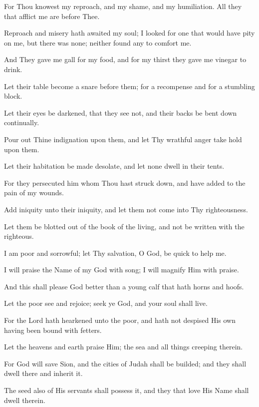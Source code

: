 For Thou knowest my reproach, and my shame, and my humiliation. All they that afflict me are before Thee.

Reproach and misery hath awaited my soul; I looked for one that would have pity on me, but there was none; neither found any to comfort me.

And They gave me gall for my food, and for my thirst they gave me vinegar to drink.

Let their table become a snare before them; for a recompense and for a stumbling block.

Let their eyes be darkened, that they see not, and their backs be bent down continually.

Pour out Thine indignation upon them, and let Thy wrathful anger take hold upon them.

Let their habitation be made desolate, and let none dwell in their tents.

For they persecuted him whom Thou hast struck down, and have added to the pain of my wounds.

Add iniquity unto their iniquity, and let them not come into Thy righteousness.

Let them be blotted out of the book of the living, and not be written with the righteous.

I am poor and sorrowful; let Thy salvation, O God, be quick to help me.

I will praise the Name of my God with song; I will magnify Him with praise.

And this shall please God better than a young calf that hath horns and hoofs.

Let the poor see and rejoice; seek ye God, and your soul shall live.

For the Lord hath hearkened unto the poor, and hath not despised His own having been bound with fetters.

Let the heavens and earth praise Him; the sea and all things creeping therein.

For God will save Sion, and the cities of Judah shall be builded; and they shall dwell there and inherit it.

The seed also of His servants shall possess it, and they that love His Name shall dwell therein.
